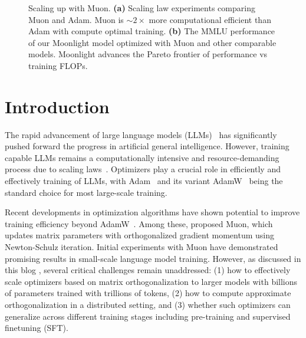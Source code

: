 
\begin{figure}[h]
    \centering
    \caption{Scaling up with Muon. \textbf{(a)} Scaling law experiments comparing Muon and Adam. Muon is $\sim2\times$ more computational efficient than Adam with compute optimal training. \textbf{(b)} The MMLU performance of our Moonlight model optimized with Muon and other comparable models. Moonlight advances the Pareto frontier of performance vs training FLOPs.} 
    \label{fig:teaser} 
\end{figure}

\section{Introduction}


The rapid advancement of large language models (LLMs)~\citep{openai2024gpt4technicalreport,deepseekai2024deepseekv3technicalreport,grattafiori2024llama3herdmodels,geminiteam2024geminifamilyhighlycapable} has significantly pushed forward the progress in artificial general intelligence. However, training capable LLMs remains a computationally intensive and resource-demanding process due to scaling laws~\citep{kaplan2020scalinglawsneurallanguage,hoffmann2022trainingcomputeoptimallargelanguage}. Optimizers play a crucial role in efficiently and effectively training of LLMs, with Adam~\citep{adam2015kingma} and its variant AdamW~\citep{loshchilov2018decoupled} being the standard choice for most large-scale training.

Recent developments in optimization algorithms have shown potential to improve training efficiency beyond AdamW~\citep{liu2024sophia,jordan2024muon,yuan2024mars,vyas2025soap,Li_2018,li2018preconditionermatrixliegroup,pooladzandi2024curvatureinformedsgdgeneralpurpose,li2022blackboxliegroup,li2024stochastichessianfittingslie,pethick2025trainingdeeplearningmodels}. Among these, \cite{jordan2024muon} proposed Muon, which updates matrix parameters with orthogonalized gradient momentum using Newton-Schulz iteration. Initial experiments with Muon have demonstrated promising results in small-scale language model training. However, as discussed in this blog \citep{jordan2024muon}, several critical challenges remain unaddressed: (1) how to effectively scale optimizers based on matrix orthogonalization to larger models with billions of parameters trained with trillions of tokens, (2) how to compute approximate orthogonalization in a distributed setting, and (3) whether such optimizers can generalize across different training stages including pre-training and supervised finetuning (SFT).

